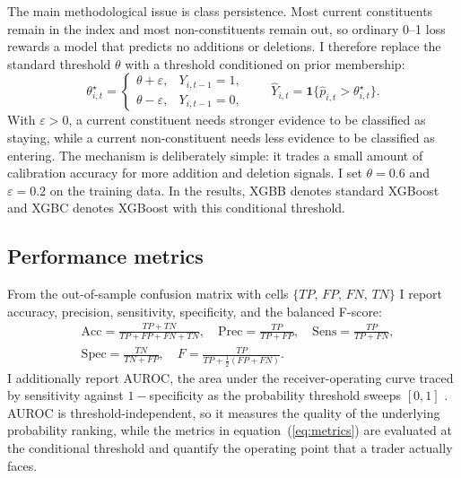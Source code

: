 The main methodological issue is class persistence. Most current constituents remain in the index and most non-constituents remain out, so ordinary 0--1 loss rewards a model that predicts no additions or deletions. I therefore replace the standard threshold $\theta$ with a threshold conditioned on prior membership:
\begin{equation}
\theta^{\star}_{i,t} =
\begin{cases}
\theta + \varepsilon, & Y_{i,t-1}=1,\\
\theta - \varepsilon, & Y_{i,t-1}=0,
\end{cases}
\qquad
\hat{Y}_{i,t}=\mathbf{1}\{\hat{p}_{i,t}>\theta^{\star}_{i,t}\}.
\label{eq:cppt}
\end{equation}
With $\varepsilon>0$, a current constituent needs stronger evidence to be classified as staying, while a current non-constituent needs less evidence to be classified as entering. The mechanism is deliberately simple: it trades a small amount of calibration accuracy for more addition and deletion signals. I set $\theta=0.6$ and $\varepsilon=0.2$ on the training data. In the results, XGBB denotes standard XGBoost and XGBC denotes XGBoost with this conditional threshold.

\subsection{Performance metrics}

From the out-of-sample confusion matrix with cells $\{TP,\,FP,\,FN,\,TN\}$ I report accuracy, precision, sensitivity, specificity, and the balanced F-score:
\begin{equation}
\begin{aligned}
&\text{Acc}=\frac{TP+TN}{TP+FP+FN+TN},
\quad \text{Prec}=\frac{TP}{TP+FP},
\quad \text{Sens}=\frac{TP}{TP+FN}, \\[2pt]
&\text{Spec}=\frac{TN}{TN+FP},
\quad F=\frac{TP}{TP+\tfrac{1}{2}(FP+FN)}.
\end{aligned}
\label{eq:metrics}
\end{equation}
I additionally report AUROC, the area under the receiver-operating curve traced by sensitivity against $1-$specificity as the probability threshold sweeps $[0,1]$ \parencite{fawcett-an-introduction-to-roc-analysis,hanley-area-under-a-receiver-operating-curve}. AUROC is threshold-independent, so it measures the quality of the underlying probability ranking, while the metrics in equation~(\ref{eq:metrics}) are evaluated at the conditional threshold and quantify the operating point that a trader actually faces.

